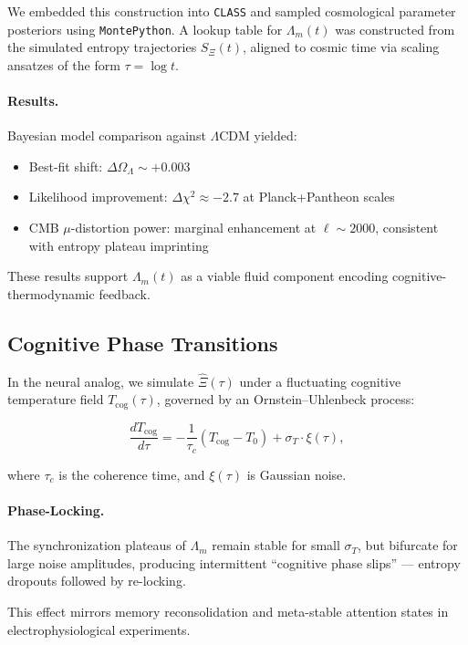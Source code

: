 \documentclass{article}
\theoremstyle{plain}
\theoremstyle{claimstyle}
\begin{document}
We embedded this construction into \texttt{CLASS} and sampled cosmological parameter posteriors using \texttt{MontePython}. A lookup table for $\Lambda_m(t)$ was constructed from the simulated entropy trajectories $S_\Xi(t)$, aligned to cosmic time via scaling ansatzes of the form $\tau = \log t$.

\paragraph{Results.} Bayesian model comparison against $\Lambda$CDM yielded:
\begin{itemize}
    \item Best-fit shift: $\Delta \Omega_\Lambda \sim +0.003$
    \item Likelihood improvement: $\Delta \chi^2 \approx -2.7$ at Planck+Pantheon scales
    \item CMB $\mu$-distortion power: marginal enhancement at $\ell \sim 2000$, consistent with entropy plateau imprinting
\end{itemize}

These results support $\Lambda_m(t)$ as a viable fluid component encoding cognitive-thermodynamic feedback.

\subsection{Cognitive Phase Transitions}

In the neural analog, we simulate $\hat{\Xi}(\tau)$ under a fluctuating cognitive temperature field $T_{\text{cog}}(\tau)$, governed by an Ornstein–Uhlenbeck process:

\begin{equation}
\frac{d T_{\text{cog}}}{d\tau} = -\frac{1}{\tau_c} \left( T_{\text{cog}} - T_0 \right) + \sigma_T \cdot \xi(\tau),
\end{equation}

where $\tau_c$ is the coherence time, and $\xi(\tau)$ is Gaussian noise.

\paragraph{Phase-Locking.} The synchronization plateaus of $\Lambda_m$ remain stable for small $\sigma_T$, but bifurcate for large noise amplitudes, producing intermittent “cognitive phase slips” — entropy dropouts followed by re-locking.

This effect mirrors memory reconsolidation and meta-stable attention states in electrophysiological experiments.
\end{document}
